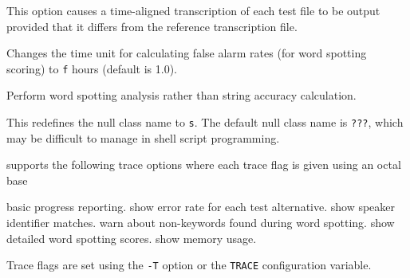 \begin{optlist}
   This option causes a time-aligned transcription of
      each test file to be output provided that it differs from
      the reference transcription file.

   Changes the time unit for calculating false alarm
      rates (for word spotting scoring) to \texttt{f} hours (default is 1.0).

   Perform word spotting analysis rather than string
      accuracy calculation.  

   This redefines the null class name to {\tt s}. 
  The default null class name is {\tt ???}, which may be difficult 
  to manage in shell script programming.

\stdoptG
\stdoptI
\stdoptL
\stdoptX

\end{optlist}


 supports the following trace options where each
trace flag is given using an octal base
\begin{optlist}
    basic progress reporting.
    show error rate for each test alternative.
    show speaker identifier matches.
    warn about non-keywords found during word spotting.
    show detailed word spotting scores.
    show memory usage.
\end{optlist}
Trace flags are set using the \texttt{-T} option or the  \texttt{TRACE} 
configuration variable.


